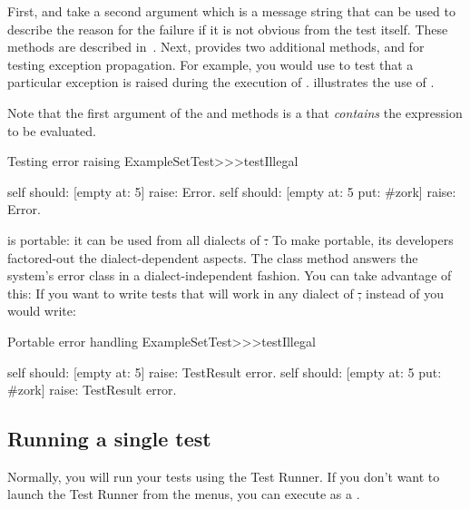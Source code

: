 \documentclass[a4paper,10pt,twoside]{book}
\begin{document}
First,  and  take a second argument which is a message string that can be used to describe the reason for the failure if it is not obvious from the test itself.
These methods are described in~.
Next, \sunit provides two additional methods,  and
 for testing exception propagation.
For example, you would use  to test that a particular exception is raised during the execution of .
 illustrates the use of \mbox{.}

Note that the first argument of the  and  methods is a  that \emph{contains} the expression to be evaluated.   

\begin{method}[ESTtestIllegal]{Testing error raising}
ExampleSetTest>>>testIllegal

	self should: [empty at: 5] raise: Error.
	self should: [empty at: 5 put: #zork] raise: Error.
\end{method}

\sunit is portable: it can be used from all dialects of \st.
To make \sunit portable, its developers factored-out the dialect-dependent aspects.
The class method  answers the system's error class in a dialect-independent fashion.
You can take advantage of this:
If you want to write tests that will work in any dialect of \st, instead of  you would write:

\begin{method}[portabletestillegal]{Portable error handling}
ExampleSetTest>>>testIllegal

	self should: [empty at: 5] raise: TestResult error.
	self should: [empty at: 5 put: #zork] raise: TestResult error.
\end{method}


\subsection{Running a single test}
Normally, you will run your tests using the Test Runner.
If you don't want to launch the Test Runner from the menus, you can execute  as a .
\end{document}
